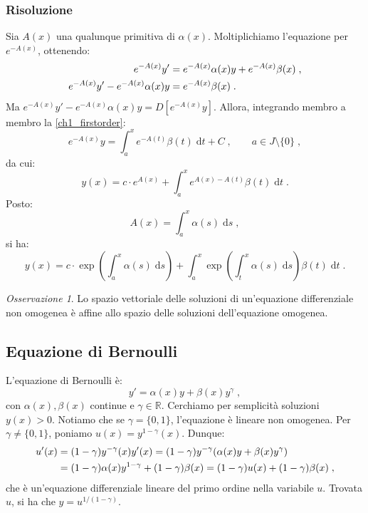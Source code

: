 \documentclass[a4paper,12pt]{report}
\theoremstyle{plain}
\theoremstyle{definition}
\theoremstyle{remark}
\newtheorem{oss}{Osservazione}[section]
\newcommand{\diff}[1]{\mathrm{d}#1}
\numberwithin{equation}{section}
\begin{document}
\subsubsection*{Risoluzione}
Sia $A(x)$ una qualunque primitiva di $\alpha(x)$. Moltiplichiamo l'equazione per $e^{-A(x)}$, ottenendo:
\begin{align}
e^{-A(x)}y' &= e^{-A(x)}\alpha(x)y+e^{-A(x)}\beta(x)\;, \notag \\
e^{-A(x)}y'-e^{-A(x)}\alpha(x)y&=e^{-A(x)}\beta(x)\;. \label{ch1_firstorder}
\end{align}
Ma $e^{-A(x)}y'-e^{-A(x)}\alpha(x)y=D[e^{-A(x)}y]$. Allora, integrando membro a membro la \eqref{ch1_firstorder}:
\begin{equation}
e^{-A(x)}y=\int_a^x e^{-A(t)}\beta(t)\;\diff{t} + C\;, \qquad a \in J \setminus \{0\}\;,
\end{equation}
da cui:
\begin{equation}
y(x)=c\cdot e^{A(x)}+\int_a^x e^{A(x)-A(t)} \beta(t)\;\diff{t}\;.
\end{equation}
Posto:
\begin{equation}
A(x)=\int_a^x \alpha(s)\;\diff{s}\;,
\end{equation}
si ha:
\begin{equation}
y(x)=c \cdot \exp\left(\int_a^x \alpha(s)\;\diff{s}\right)+\int_a^x \exp\left(\int_t^x \alpha(s)\;\diff{s}\right)\beta(t)\;\diff{t}\;.
\end{equation}
\begin{oss} Lo spazio vettoriale delle soluzioni di un'equazione differenziale non omogenea è affine allo spazio delle soluzioni dell'equazione omogenea.
\end{oss}
\subsection{Equazione di Bernoulli}
L'equazione di Bernoulli è:
\begin{equation}
y'=\alpha(x)y+\beta(x)y^{\gamma}\;,
\end{equation}
con $\alpha(x),\beta(x)$ continue e $\gamma \in \mathbb{R}$. Cerchiamo per semplicità soluzioni $y(x)>0$. Notiamo che se $\gamma=\{0,1\}$, l'equazione è lineare non omogenea. Per $\gamma \ne \{0,1\}$, poniamo $u(x)=y^{1-\gamma}(x)$. Dunque:
\begin{align}
u'(x) &= (1-\gamma)y^{-\gamma}(x)y'(x)=(1-\gamma)y^{-\gamma}(\alpha(x)y+\beta(x)y^{\gamma}) \notag \\
&=(1-\gamma)\alpha(x)y^{1-\gamma}+(1-\gamma)\beta(x)=(1-\gamma)u(x)+(1-\gamma)\beta(x)\;,
\end{align}
che è un'equazione differenziale lineare del primo ordine nella variabile $u$. Trovata $u$, si ha che $y=u^{1/(1-\gamma)}$.
\end{document}
